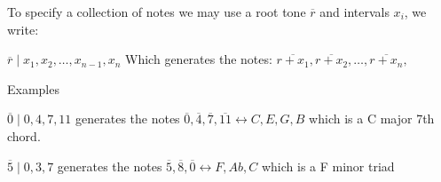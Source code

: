 \documentclass[preview]{standalone}
\begin{document}
\begin{center}
To specify a collection of notes we may use a root tone $\overline{r}$ and intervals $x_i$, we write:

	  $\overline{r} \mid x_{1} , x_{2} , \dotsc  , x_{n - 1} , x_{n}$ Which generates the notes: $\overline{r  +  x_{1}}, \overline{r  +  x_{2}}, \ldots, \overline{r  +  x_{n}}, $
  
  Examples

	$ \overline{0} \mid 0, 4, 7, 11$ generates the notes $ \overline{0}, \overline{4}, \overline{7}, \overline{11} \leftrightarrow C, E, G, B$ which is a C major 7th chord.

	$ \overline{5} \mid 0, 3, 7$ generates the notes $ \overline{5}, \overline{8}, \overline{0} \leftrightarrow F, Ab, C$ which is a F minor triad
\end{center}
\end{document}
